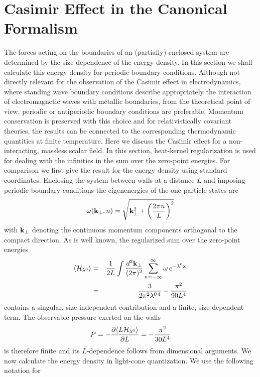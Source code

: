 \documentclass[a4paper,twocolumn,eqsecnum,aps]{revtex4}
\begin{document}

\section{Casimir Effect in the Canonical Formalism}  
The forces acting on the boundaries of an (partially) enclosed system are determined by 
the size dependence of the  energy density. In this section we shall calculate this energy 
density for periodic boundary conditions. Although not directly relevant for the observation 
of the Casimir effect in electrodynamics, where standing wave boundary conditions 
describe appropriately the interaction of electromagnetic waves with metallic boundaries, 
from the theoretical point of view, periodic or antiperio\-dic boundary conditions are preferable. 
Momentum conservation is preserved with this choice and for re\-la\-tivistically covariant theories, 
the results  can be connected to the corresponding thermodynamic quantities at 
finite temperature. Here we discuss the Casimir effect for a non-interacting, massless scalar field. In this section,  heat-kernel regularization is used for dealing with the infinities in the sum over the zero-point energies. For comparison 
we first give the result for the energy density using standard coordinates. Enclosing  the system 
bet\-ween walls at a distance $L$ and imposing periodic boun\-dary conditions the 
eigenenergies of the one particle states are   
$$\omega({\bf k}_{\perp},n) = \sqrt{{\bf k}_{\perp}^2 +\left(\frac{2\pi n}{L}\right)^2}$$
with ${\bf k}_{\perp}$ denoting the continuous momentum components orthogonal to the compact 
direction. As is well known, the regularized sum over the zero-point energies  
\begin{eqnarray}
\label{energie}
\langle{\cal H}_{\lambda^{0}}\rangle &=& \frac{1}{2L} \int\frac{d^2{\bf k}_\perp}{(2\pi)^2}\sum_{n=-\infty}^{\infty}\omega \,e^{-\lambda^{0}\omega}\nonumber\\
&=& \frac{3}{2\pi^2\lambda^{0\,4}}-\frac{\pi^2}{90 L^4} 
\end{eqnarray}
contains a singular, size independent contribution and a finite, size dependent term. 
The observable pressure exerted on the walls 
$$P= -\frac{\partial \langle L {\cal H}_{\lambda^{0}}\rangle }{\partial L} =- \frac{\pi^2}{30 L^4} $$
is therefore finite and  its $L$-dependence follows from dimensional arguments.
\newline
We now calculate the energy density in light-cone quantization. We use the following notation for 
\end{document}
